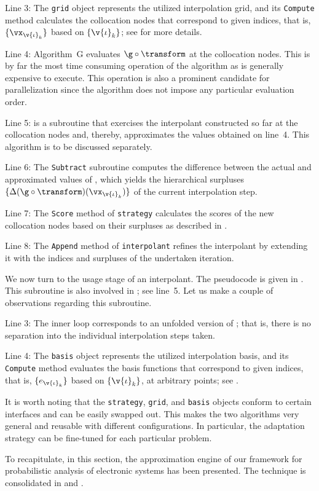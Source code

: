 Line 3: The \texttt{grid} object represents the utilized interpolation grid, and
its \texttt{Compute} method calculates the collocation nodes that correspond to
given indices, that is, $\{ \vx_{\v{\iota}_k} \}$ based on $\{ \v{\iota}_k \}$;
see  for more details.

Line 4: Algorithm~G evaluates $\g \circ \transform$ at the collocation nodes.
This is by far the most time consuming operation of the algorithm as \g is
generally expensive to execute. This operation is also a prominent candidate for
parallelization since the algorithm does not impose any particular evaluation
order.

Line 5:  is a subroutine that exercises the interpolant
constructed so far at the collocation nodes and, thereby, approximates the
values obtained on line~4. This algorithm is to be discussed separately.

Line 6: The \texttt{Subtract} subroutine computes the difference between the
actual and approximated values of \g, which yields the hierarchical surpluses
$\{ \Delta(\g \circ \transform)(\vx_{\v{\iota}_k}) \}$ of the current
interpolation step.

Line 7: The \texttt{Score} method of \texttt{strategy} calculates the scores of
the new collocation nodes based on their surpluses as described in
.

Line 8: The \texttt{Append} method of \texttt{interpolant} refines the
interpolant by extending it with the indices and surpluses of the undertaken
iteration.

We now turn to the usage stage of an interpolant. The pseudocode is given in
. This subroutine is also involved in
; see line~5. Let us make a couple of observations
regarding this subroutine.

Line 3: The inner loop corresponds to an unfolded version of
; that is, there is no separation into the individual
interpolation steps taken.

Line 4: The \texttt{basis} object represents the utilized interpolation basis,
and its \texttt{Compute} method evaluates the basis functions that correspond to
given indices, that is, $\{ e_{\v{\iota}_k} \}$ based on $\{ \v{\iota}_k \}$, at
arbitrary points; see .

It is worth noting that the \texttt{strategy}, \texttt{grid}, and \texttt{basis}
objects conform to certain interfaces and can be easily swapped out. This makes
the two algorithms very general and reusable with different configurations. In
particular, the adaptation strategy can be fine-tuned for each particular
problem.

\conclusioncut
To recapitulate, in this section, the approximation engine of our framework for
probabilistic analysis of electronic systems has been presented. The technique
is consolidated in  and .
